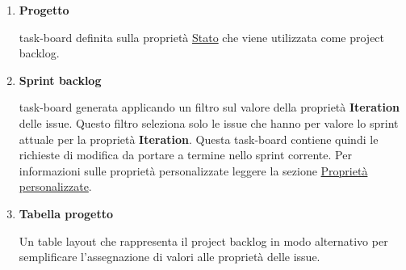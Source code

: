 \begin{enumerate}
    \item \textbf{Progetto}
    
    task-board definita sulla proprietà \hyperref[subpar:github_stato]{Stato} che viene utilizzata come project backlog.

    \item \textbf{Sprint backlog} \label{item:sprint_backlog}
    
    task-board generata applicando un filtro sul valore della proprietà \textbf{Iteration} delle issue.
    Questo filtro seleziona solo le issue che hanno per valore lo sprint attuale per la proprietà \textbf{Iteration}.
    Questa task-board contiene quindi le richieste di modifica da portare a termine nello sprint corrente.
    Per informazioni sulle proprietà personalizzate leggere la sezione \hyperref[subpar:proprietà_personalizzate]{Proprietà personalizzate}.

    \item \textbf{Tabella progetto}
    
    Un table layout che rappresenta il project backlog in modo alternativo per semplificare l'assegnazione di valori alle proprietà delle issue.
\end{enumerate}

